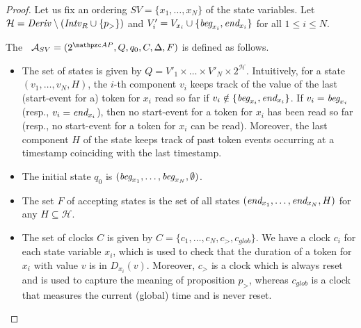  \begin{proof}
Let us fix an ordering $SV=\{x_1,\ldots,x_N\}$ of the state variables. Let $\mathcal{H}= {\mathit{Deriv}}\setminus ({\mathit{Intv}}_R \cup \{p_>\})$ and $V'_i = V_{x_i}\cup \{\textit{beg}_{x_i},\textit{end}_{x_i}\}$ for all $1\leq i\leq N$.

The  \TA\ $\Au_{SV}=\tpl{2^{\Prop},Q,q_0,C,\Delta,F}$ is defined as follows.
\begin{itemize}
\item The set of states is given
by $Q= V'_1\times \ldots \times V'_N \times 2^{\mathcal{H}}$. Intuitively, for a state $(v_1,\ldots,v_N, H)$, the $i$-th component $v_i$ keeps track of the value of the last (start-event for a) token for $x_i$ read so far
  if $v_i \notin \{\textit{beg}_{x_i},\textit{end}_{x_i}\}$. If $v_i =\textit{beg}_{x_i}$ (resp., $v_i =\textit{end}_{x_i}$), then no start-event for a token for $x_i$ has been read so far (resp., no start-event for a token for $x_i$ can be read). Moreover, the last component $H$ of the state
  keeps track of past token events occurring at a timestamp coinciding with the last timestamp.
\item The initial state $q_0$ is $(\textit{beg}_{x_1},\ldots,\textit{beg}_{x_N},\emptyset)$.
\item The set $F$ of accepting states is the set of all states
  $(\textit{end}_{x_1},\ldots,\textit{end}_{x_N},\allowbreak H)$ for any $H\subseteq \mathcal{H}$.

\item   The set of clocks $C$ is given by $C=\{c_1,\ldots,c_N,c_>,c_{glob}\}$. We have a clock $c_i$ for each state variable $x_i$,  which is used to check that the duration
  of a token for $x_i$ with value $v$ is in $D_{x_i}(v)$. Moreover, $c_>$ is a clock which is always reset and is used to capture the meaning of proposition $p_>$,
   whereas $c_{glob}$ is a clock that measures the current (global) time and is never reset.


\end{itemize}
\end{proof}
